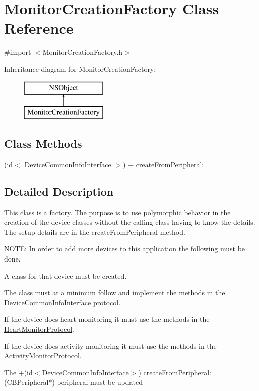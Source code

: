 \hypertarget{interface_monitor_creation_factory}{\section{Monitor\-Creation\-Factory Class Reference}
\label{interface_monitor_creation_factory}
}


{\ttfamily \#import $<$Monitor\-Creation\-Factory.\-h$>$}

Inheritance diagram for Monitor\-Creation\-Factory\-:\begin{figure}[H]
\begin{center}
\leavevmode
\includegraphics[height=2.000000cm]{interface_monitor_creation_factory}
\end{center}
\end{figure}
\subsection*{Class Methods}
\begin{DoxyCompactItemize}
\item 
(id$<$ \hyperlink{protocol_device_common_info_interface-p}{Device\-Common\-Info\-Interface} $>$) + \hyperlink{interface_monitor_creation_factory_abe947f8b7d9f30a4438112bbdea8dda1}{create\-From\-Peripheral\-:}
\end{DoxyCompactItemize}


\subsection{Detailed Description}
This class is a factory. The purpose is to use polymorphic behavior in the creation of the device classes without the calling class having to know the details. The setup details are in the create\-From\-Peripheral method.

N\-O\-T\-E\-: In order to add more devices to this application the following must be done.


\begin{DoxyEnumerate}
\item A class for that device must be created.
\item The class must at a minimum follow and implement the methods in the \hyperlink{protocol_device_common_info_interface-p}{Device\-Common\-Info\-Interface} protocol.
\item If the device does heart monitoring it must use the methods in the \hyperlink{protocol_heart_monitor_protocol-p}{Heart\-Monitor\-Protocol}.
\item If the device does activity monitoring it must use the methods in the \hyperlink{protocol_activity_monitor_protocol-p}{Activity\-Monitor\-Protocol}.
\item The +(id$<$\-Device\-Common\-Info\-Interface$>$) create\-From\-Peripheral\-: (C\-B\-Peripheral$\ast$) peripheral must be updated
\end{DoxyEnumerate}

